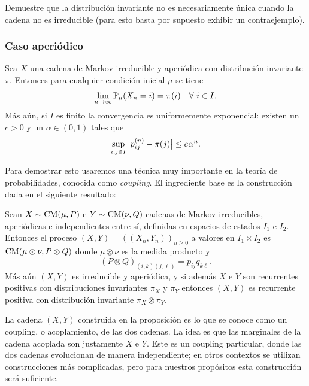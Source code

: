 \begin{exer}
Demuestre que la distribución invariante no es necesariamente única cuando la cadena no es irreducible (para esto basta por supuesto exhibir un contraejemplo).
\end{exer}

\subsubsection{Caso aperiódico}

\begin{thm}\label{thm:equil}
Sea $X$ una cadena de Markov irreducible y aperiódica con distribución invariante $\pi$.
Entonces para cualquier condición inicial $\mu$ se tiene
\[\lim_{n\to\infty}\mathbb{P}_\mu(X_n=i)=\pi(i)\quad\forall~i\in I.\]
Más aún, si $I$ es finito la convergencia es uniformemente exponencial: existen un $c>0$ y un $\alpha\in(0,1)$ tales que
\[\sup_{i,j\in I}\big|p_{ij}^{(n)}-\pi(j)\big|\leq c\hspace{0.05em}\alpha^n.\]
\end{thm}

Para demostrar esto usaremos una técnica muy importante en la teoría de probabilidades, conocida como \emph{coupling}.
El ingrediente base es la construcción dada en el siguiente resultado:

\begin{prop}\label{prop:couplingMC}
Sean $X\sim\text{\upshape{CM}}(\mu,P)$ e $Y\sim\text{\upshape{CM}}(\nu,Q)$ cadenas de Markov irreducibles, aperiódicas e independientes entre sí, definidas en espacios de estados $I_1$ e $I_2$.
Entonces el proceso $(X,Y)=((X_n,Y_n))_{n\geq0}$ a valores en $I_1\times I_2$ es $\text{\upshape{CM}}(\mu\otimes\nu,P\otimes Q)$ donde $\mu\otimes\nu$ es la medida producto y
\[(P\otimes Q)_{(i,k)(j,\ell)}=p_{ij}q_{k\ell}.\]
Más aún $(X,Y)$ es irreducible y aperiódica, y si además $X$ e $Y$ son recurrentes positivas con distribuciones invariantes $\pi_X$ y $\pi_Y$ entonces $(X,Y)$ es recurrente positiva con distribución invariante $\pi_X\otimes\pi_Y$.
\end{prop}

\begin{rem}
La cadena $(X,Y)$ construida en la proposición es lo que se conoce como un coupling, o acoplamiento, de las dos cadenas.
La idea es que las marginales de la cadena acoplada son justamente $X$ e $Y$.
Este es un coupling particular, donde las dos cadenas evolucionan de manera independiente; en otros contextos se utilizan construcciones más complicadas, pero para nuestros propósitos esta construcción será suficiente.
\end{rem}

